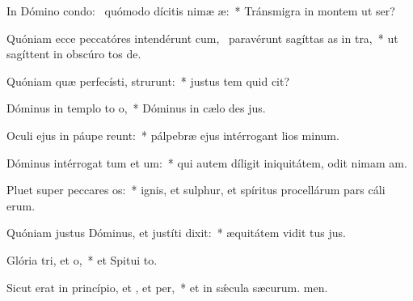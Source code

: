 \item In Dómino condo:~\pscross{} quómodo dícitis nimæ æ:~* Tránsmigra in montem ut ser?
\item Quóniam ecce peccatóres intendérunt cum,~\pscross{} paravérunt sagíttas as in tra,~* ut sagíttent in obscúro tos de.
\item Quóniam quæ perfecísti, strurunt:~* justus tem quid cit?
\item Dóminus in templo to o,~* Dóminus in cælo des jus.
\item Oculi ejus in páupe reunt:~* pálpebræ ejus intérrogant lios minum.
\item Dóminus intérrogat tum et um:~* qui autem díligit iniquitátem, odit nimam am.
\item Pluet super peccares os:~* ignis, et sulphur, et spíritus procellárum pars cáli erum.
\item Quóniam justus Dóminus, et justíti dixit:~* æquitátem vidit tus jus.
\item Glória tri, et o,~* et Spitui to.
\item Sicut erat in princípio, et , et per,~* et in sǽcula sæcurum. men.
